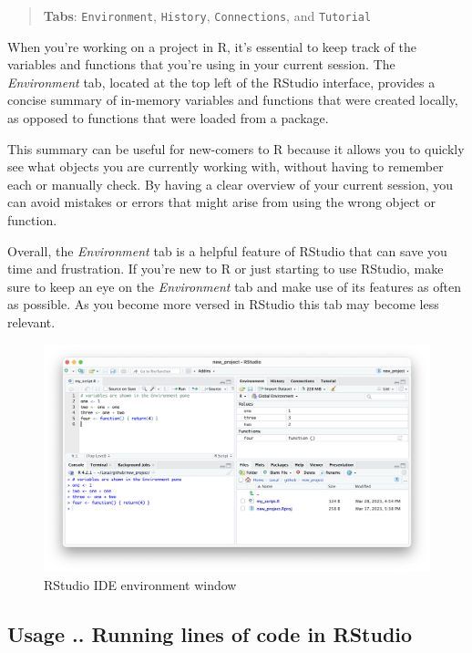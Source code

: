 \documentclass[
]{book}
\begin{document}
\begin{quote}
\textbf{Tabs}: \texttt{Environment}, \texttt{History}, \texttt{Connections}, and \texttt{Tutorial}
\end{quote}

When you're working on a project in R, it's essential to keep track of the variables and functions that you're using in your current session. The \emph{Environment} tab, located at the top left of the RStudio interface, provides a concise summary of in-memory variables and functions that were created locally, as opposed to functions that were loaded from a package.

This summary can be useful for new-comers to R because it allows you to quickly see what objects you are currently working with, without having to remember each or manually check. By having a clear overview of your current session, you can avoid mistakes or errors that might arise from using the wrong object or function.

Overall, the \emph{Environment} tab is a helpful feature of RStudio that can save you time and frustration. If you're new to R or just starting to use RStudio, make sure to keep an eye on the \emph{Environment} tab and make use of its features as often as possible. As you become more versed in RStudio this tab may become less relevant.

\begin{figure}
\includegraphics[width=31.94in]{images/02_025_environment} \caption{\label{fig:2025}RStudio IDE environment window}\label{fig:2025}
\end{figure}

\hypertarget{usage-..-running-lines-of-code-in-rstudio}{%
\subsection{Usage .. Running lines of code in RStudio}\label{usage-..-running-lines-of-code-in-rstudio}}
\end{document}
